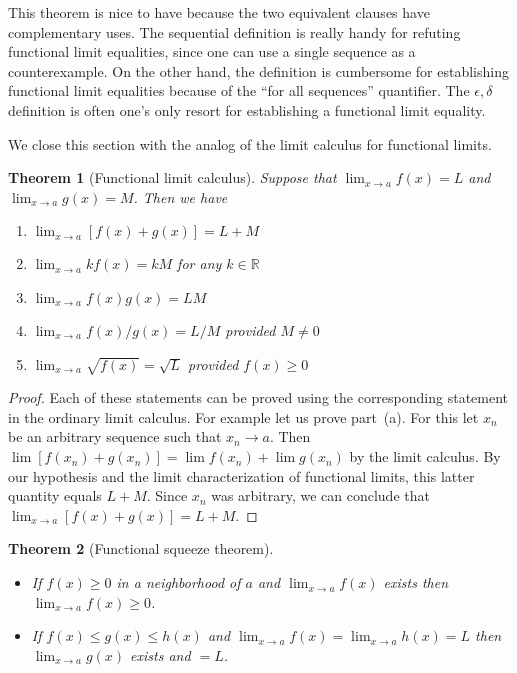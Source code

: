 \documentclass[11pt,oneside]{amsbook}
\newcommand{\R}{\mathbb R}
\theoremstyle{definition}
\theoremstyle{plain}
\newtheorem{theorem}{Theorem}[section]
\theoremstyle{definition}
\theoremstyle{remark}
\numberwithin{equation}{section}
\numberwithin{figure}{section}
\begin{document}
This theorem is nice to have because the two equivalent clauses have complementary uses. The sequential definition is really handy for refuting functional limit equalities, since one can use a single sequence as a counterexample. On the other hand, the definition is cumbersome for establishing functional limit equalities because of the ``for all sequences'' quantifier. The $\epsilon,\delta$ definition is often one's only resort for establishing a functional limit equality.

We close this section with the analog of the limit calculus for functional limits.

\begin{theorem}[Functional limit calculus]
  Suppose that $\lim_{x\to a}f(x)=L$ and $\lim_{x\to a}g(x)=M$. Then we have
  \begin{enumerate}
    \item $\displaystyle\lim_{x\to a}[f(x)+g(x)]=L+M$
    \item $\displaystyle\lim_{x\to a}kf(x)=kM$ for any $k\in\R$
    \item $\displaystyle\lim_{x\to a}f(x)g(x)=LM$
    \item $\displaystyle\lim_{x\to a}f(x)/g(x)=L/M$ provided $M\neq 0$
    \item $\displaystyle\lim_{x\to a}\sqrt{f(x)}=\sqrt{L}$ provided $f(x)\geq 0$
  \end{enumerate}
\end{theorem}

\begin{proof}
  Each of these statements can be proved using the corresponding statement in the ordinary limit calculus. For example let us prove part~(a). For this let $x_n$ be an arbitrary sequence such that $x_n\to a$. Then $\lim[f(x_n)+g(x_n)]=\lim f(x_n)+\lim g(x_n)$ by the limit calculus. By our hypothesis and the limit characterization of functional limits, this latter quantity equals $L+M$. Since $x_n$ was arbitrary, we can conclude that $\lim_{x\to a}[f(x)+g(x)]=L+M$.
\end{proof}

\begin{theorem}[Functional squeeze theorem]\
  \begin{itemize}
  \item If $f(x)\geq0$ in a neighborhood of $a$ and $\lim_{x\to a}f(x)$ exists then $\lim_{x\to a}f(x)\geq0$.
  \item If $f(x)\leq g(x)\leq h(x)$ and $\lim_{x\to a}f(x)=\lim_{x\to a}h(x)=L$ then $\lim_{x\to a}g(x)$ exists and $=L$.
  \end{itemize}
\end{theorem}
\end{document}
